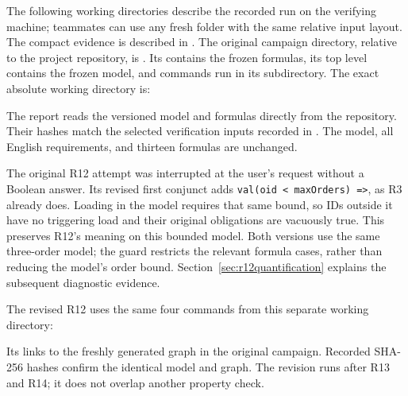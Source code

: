 \documentclass[11pt,a4paper]{article}
\begin{document}
The following working directories describe the recorded run on the verifying machine; teammates can use any fresh folder with the same relative input layout. The compact evidence is described in . The original campaign directory, relative to the project repository, is . Its  contains the frozen formulas, its top level contains the frozen model, and commands run in its  subdirectory. The exact absolute working directory is:
\begin{quote}\small{}\end{quote}
The report reads the versioned model and formulas directly from the repository. Their hashes match the selected verification inputs recorded in . The model, all English requirements, and thirteen formulas are unchanged.

The original R12 attempt was interrupted at the user's request without a Boolean answer. Its revised first conjunct adds \texttt{val(oid < maxOrders) =>}, as R3 already does. Loading in the model requires that same bound, so IDs outside it have no triggering load and their original obligations are vacuously true. This preserves R12's meaning on this bounded model. Both versions use the same three-order model; the guard restricts the relevant formula cases, rather than reducing the model's order bound. Section~\ref{sec:r12quantification} explains the subsequent diagnostic evidence.

The revised R12 uses the same four commands from this separate working directory:
\begin{quote}\small{}\end{quote}
Its  links to the freshly generated graph in the original campaign. Recorded SHA-256 hashes confirm the identical model and graph. The revision runs after R13 and R14; it does not overlap another property check.


\end{document}
